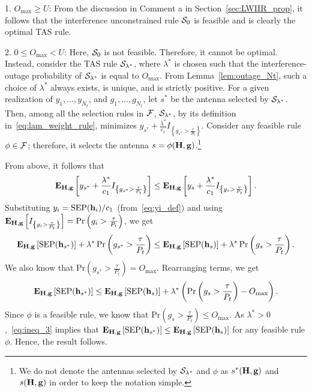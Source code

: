 \documentclass[12pt,draftcls,peerreview,onecolumn]{IEEEtran}
\newcommand{\brac}[1]{\left({#1}\right)}
\newcommand{\cbrac}[1]{\left\{{#1}\right\}}
\newcommand{\indic}[1]{I_{\cbrac{#1}}}
\newcommand{\mtx}[1]{{\bf #1}} %
\newcommand{\explow}[2]{{\bf{E}}_{#1}\left[{#2}\right]}
\newcommand{\prob}[1]{\text{Pr}\brac{#1}}
\newcommand{\SEP}{\text{SEP}}
\newcommand{\lam}{\lambda}
\newcommand{\lamstar}{\lam^{*}}
\newcommand{\sstar}{s^{*}}
\newcommand{\F}{\cal{F}}
\newcommand{\Nt}{{N_t}}
\newcommand{\Pt}{{P_t}}
\newcommand{\puch}{g}
\newcommand{\gk}[1]{{\puch_{#1}}}
\newcommand{\g}{\mathbf{\puch}}
\newcommand{\outmax}{O_{\text{max}}}
\newcommand{\itau}{\tau}
\newcommand{\cone}{c_{1}}
\newcommand{\taubypt}{\frac{\itau}{\Pt}}
\newcommand{\gkgrtaubypt}[1]{{\gk{#1}}>\taubypt}
\newcommand{\gindic}[1]{\indic{\gkgrtaubypt{#1}}}
\newcommand{\yk}[1]{y_{#1}}
\newcommand{\un}{U}
\newcommand{\asrule}{\phi}
\newcommand{\Hmx}{\mtx{H}}
\newcommand{\caluncons}{{\cal S_{\text{0}}}}
\newcommand{\callamstarrule}{\cal S_{\lam^{*}}}
\begin{document}
{ 1. $\outmax\geq\un$:} From the discussion in Comment a in Section~\ref{sec:LWIIR_prop}, it follows that the interference unconstrained rule $\caluncons$ is feasible and is clearly the optimal TAS rule. 

{2. $0\leq\outmax<\un$:} Here, $\caluncons$ is not feasible. Therefore, it cannot be optimal.  Instead, consider the TAS rule $\callamstarrule$, where $\lamstar$ is chosen such that the interference-outage probability of $\callamstarrule$ is equal to $\outmax$. From Lemma~\ref{lem:outage_Nt}, such a choice of $\lamstar$ always exists, is unique, and is strictly positive. For a given realization of $\yk{1},\ldots,\yk{\Nt}$, and $\gk{1},\ldots,\gk{\Nt}$, let $\sstar$ be the antenna selected by $\callamstarrule$. Then, among all the selection rules in $\F$, $\callamstarrule$, by its definition in~\eqref{eq:lam_weight_rule},  minimizes $\yk{{\sstar}} + \frac{\lamstar}{\cone}\gindic{{\sstar}}$. Consider any feasible rule $\asrule\in\F$; therefore, it selects the antenna  $s=\phi(\Hmx,\g)$.\footnote{We do not denote the antennas selected by $\callamstarrule$ and $\phi$ as $s^*(\Hmx,\g)$ and $s(\Hmx,\g)$ in order to keep the notation simple.} 

From above, it follows that   
\begin{equation}
\label{eq:opt_rul_1}  
   \explow{\Hmx,\g}{\yk{{\sstar}} + \frac{\lamstar}{\cone}\gindic{{\sstar}}} \leq  \explow{\Hmx,\g}{\yk{{s}} + \frac{\lamstar}{\cone}\gindic{{s}}}.
\end{equation}
%
Substituting $\yk{i}={\SEP(\bhk{i})}/{\cone}$ (from~\eqref{eq:yi_def}) and using $\explow{\Hmx,\g}{\gindic{i}}=\prob{\gk{i}>\taubypt}$, we get
%
\begin{equation}
\label{eq:opt_rul_2}
   \explow{\Hmx,\g}{\SEP(\hsstar)} + \lamstar \, \prob{\gk{\sstar}>\taubypt} \leq  \explow{\Hmx,\g}{\SEP(\hs)} + \lamstar \, \prob{\gk{s}>\taubypt}.
\end{equation}
%
We also know that $\prob{\gk{\sstar}>\taubypt}=\outmax$. Rearranging terms, we get
%
\begin{equation}
\label{eq:ineq_3}
\explow{\Hmx,\g}{\SEP(\hsstar)} \leq \explow{\Hmx,\g}{\SEP(\hs)} + \lamstar \left( \prob{\gk{s}>\taubypt} -  \outmax \right).
\end{equation}
%
Since $\phi$ is a feasible rule, we know that $\prob{\gkgrtaubypt{s}}\leq \outmax$. As $\lamstar>0$,~\eqref{eq:ineq_3} implies that $\explow{\Hmx,\g}{\SEP(\hsstar)} \leq \explow{\Hmx,\g}{\SEP(\hs)}$ for any feasible rule $\phi$. Hence, the result follows. %
\end{document}
